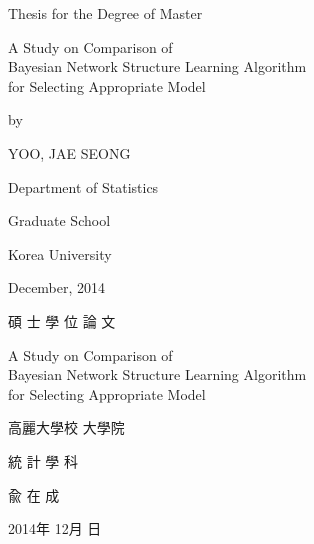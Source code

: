 \documentclass[12pt,a4paper,oneside]{book}
\theoremstyle{plain}
\theoremstyle{definition}
\theoremstyle{remark}
\theoremstyle{definition}
\numberwithin{equation}{chapter}
\begin{document}





 \linespread{1.0}
 \thispagestyle{empty}
 \begin{center}
 {\Large Thesis for the Degree of Master}
 \end{center}
 \vspace{20mm}
 \begin{center}
 \LARGE A Study on Comparison of\\ Bayesian Network Structure Learning Algorithm\\ for Selecting Appropriate Model
 \end{center}
 \vspace{20mm} 
  \begin{center}
 {\Large by}
 \end{center}
 \begin{center}
 {\Large YOO, JAE SEONG}
 \end{center}
 \vspace{40mm}
 \begin{center}
 {\Large Department of Statistics}
 \end{center}
 \begin{center}
 {\Large Graduate School}
 \end{center}
 \begin{center}
 {\Large Korea University}
 \end{center}
  \vspace{5mm}
 \begin{center}
 {\Large December, 2014}
 \end{center}
 \linespread{1.6}





\newpage{}
 \linespread{1.0}
 \thispagestyle{empty}
 \vspace{30mm}
 \begin{center}
 {\Large 碩 士 學 位 論 文}
 \end{center}
 \vspace{27mm}
 \begin{center}
 \LARGE A Study on Comparison of\\ Bayesian Network Structure Learning Algorithm\\ for Selecting Appropriate Model
 \end{center}
 \vspace{80mm}
 \begin{center}
 {\Large 高麗大學校 大學院}
 \end{center}
 \begin{center}
 {\Large 統 計 學 科}
 \end{center}
 \begin{center}
 {\Large 兪 \quad\quad 在 \quad\quad 成}
 \end{center}
  \vspace{7mm}
 \begin{center}
 {\Large 2014年 \quad 12月 \quad 日}
 \end{center}
 \linespread{1.6}
\end{document}

